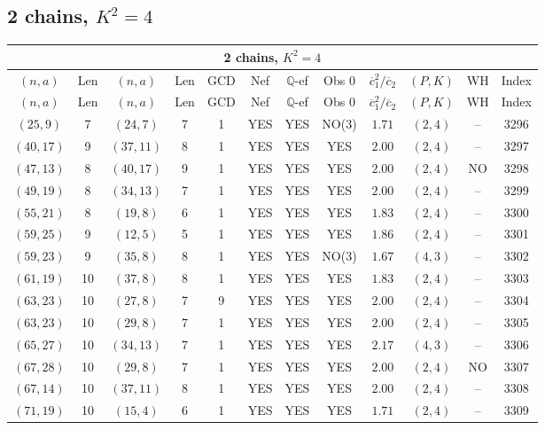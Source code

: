 \subsection{2 chains, $K^2 = 4$}
\begin{longtable}{|c|c|c|c|c|c|c|c|c|c|c|c|}
\hline
\multicolumn{12}{|c|}{2 chains, $K^2 = 4$}\\
\hline
$(n,a)$ & Len & $(n,a)$ & Len & GCD & Nef & $\mathbb Q$-ef & Obs 0 & $\overline c_1^2 / \overline c_2$ & $(P,K)$ & WH & Index\\
\hline
\endfirsthead

\hline
$(n,a)$ & Len & $(n,a)$ & Len & GCD & Nef & $\mathbb Q$-ef & Obs 0 & $\overline c_1^2 / \overline c_2$ & $(P,K)$ & WH & Index\\
\hline
\endhead
\hline
\endfoot

$(25,9)$ & 7 & $(24,7)$ & 7 & 1 & YES & YES & NO(3) & $1.71$ & $(2,4)$ & -- & 3296\\
$(40,17)$ & 9 & $(37,11)$ & 8 & 1 & YES & YES & YES & $2.00$ & $(2,4)$ & -- & 3297\\
$(47,13)$ & 8 & $(40,17)$ & 9 & 1 & YES & YES & YES & $2.00$ & $(2,4)$ & NO & 3298\\
$(49,19)$ & 8 & $(34,13)$ & 7 & 1 & YES & YES & YES & $2.00$ & $(2,4)$ & -- & 3299\\
$(55,21)$ & 8 & $(19,8)$ & 6 & 1 & YES & YES & YES & $1.83$ & $(2,4)$ & -- & 3300\\
$(59,25)$ & 9 & $(12,5)$ & 5 & 1 & YES & YES & YES & $1.86$ & $(2,4)$ & -- & 3301\\
$(59,23)$ & 9 & $(35,8)$ & 8 & 1 & YES & YES & NO(3) & $1.67$ & $(4,3)$ & -- & 3302\\
$(61,19)$ & 10 & $(37,8)$ & 8 & 1 & YES & YES & YES & $1.83$ & $(2,4)$ & -- & 3303\\
$(63,23)$ & 10 & $(27,8)$ & 7 & 9 & YES & YES & YES & $2.00$ & $(2,4)$ & -- & 3304\\
$(63,23)$ & 10 & $(29,8)$ & 7 & 1 & YES & YES & YES & $2.00$ & $(2,4)$ & -- & 3305\\
$(65,27)$ & 10 & $(34,13)$ & 7 & 1 & YES & YES & YES & $2.17$ & $(4,3)$ & -- & 3306\\
$(67,28)$ & 10 & $(29,8)$ & 7 & 1 & YES & YES & YES & $2.00$ & $(2,4)$ & NO & 3307\\
$(67,14)$ & 10 & $(37,11)$ & 8 & 1 & YES & YES & YES & $2.00$ & $(2,4)$ & -- & 3308\\
$(71,19)$ & 10 & $(15,4)$ & 6 & 1 & YES & YES & YES & $1.71$ & $(2,4)$ & -- & 3309\\

\end{longtable}
